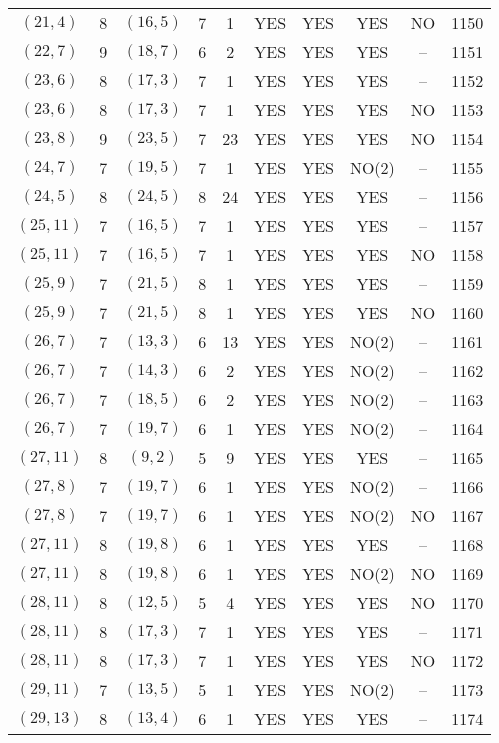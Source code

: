 \begin{longtable}{|c|c|c|c|c|c|c|c|c|c|}
$(21, 4)$ & 8 & $(16, 5)$ & 7 & 1 & YES & YES & YES & NO & 1150\\
$(22, 7)$ & 9 & $(18, 7)$ & 6 & 2 & YES & YES & YES & -- & 1151\\
$(23, 6)$ & 8 & $(17, 3)$ & 7 & 1 & YES & YES & YES & -- & 1152\\
$(23, 6)$ & 8 & $(17, 3)$ & 7 & 1 & YES & YES & YES & NO & 1153\\
$(23, 8)$ & 9 & $(23, 5)$ & 7 & 23 & YES & YES & YES & NO & 1154\\
$(24, 7)$ & 7 & $(19, 5)$ & 7 & 1 & YES & YES & NO(2) & -- & 1155\\
$(24, 5)$ & 8 & $(24, 5)$ & 8 & 24 & YES & YES & YES & -- & 1156\\
$(25, 11)$ & 7 & $(16, 5)$ & 7 & 1 & YES & YES & YES & -- & 1157\\
$(25, 11)$ & 7 & $(16, 5)$ & 7 & 1 & YES & YES & YES & NO & 1158\\
$(25, 9)$ & 7 & $(21, 5)$ & 8 & 1 & YES & YES & YES & -- & 1159\\
$(25, 9)$ & 7 & $(21, 5)$ & 8 & 1 & YES & YES & YES & NO & 1160\\
$(26, 7)$ & 7 & $(13, 3)$ & 6 & 13 & YES & YES & NO(2) & -- & 1161\\
$(26, 7)$ & 7 & $(14, 3)$ & 6 & 2 & YES & YES & NO(2) & -- & 1162\\
$(26, 7)$ & 7 & $(18, 5)$ & 6 & 2 & YES & YES & NO(2) & -- & 1163\\
$(26, 7)$ & 7 & $(19, 7)$ & 6 & 1 & YES & YES & NO(2) & -- & 1164\\
$(27, 11)$ & 8 & $(9, 2)$ & 5 & 9 & YES & YES & YES & -- & 1165\\
$(27, 8)$ & 7 & $(19, 7)$ & 6 & 1 & YES & YES & NO(2) & -- & 1166\\
$(27, 8)$ & 7 & $(19, 7)$ & 6 & 1 & YES & YES & NO(2) & NO & 1167\\
$(27, 11)$ & 8 & $(19, 8)$ & 6 & 1 & YES & YES & YES & -- & 1168\\
$(27, 11)$ & 8 & $(19, 8)$ & 6 & 1 & YES & YES & NO(2) & NO & 1169\\
$(28, 11)$ & 8 & $(12, 5)$ & 5 & 4 & YES & YES & YES & NO & 1170\\
$(28, 11)$ & 8 & $(17, 3)$ & 7 & 1 & YES & YES & YES & -- & 1171\\
$(28, 11)$ & 8 & $(17, 3)$ & 7 & 1 & YES & YES & YES & NO & 1172\\
$(29, 11)$ & 7 & $(13, 5)$ & 5 & 1 & YES & YES & NO(2) & -- & 1173\\
$(29, 13)$ & 8 & $(13, 4)$ & 6 & 1 & YES & YES & YES & -- & 1174\\

\end{longtable}
